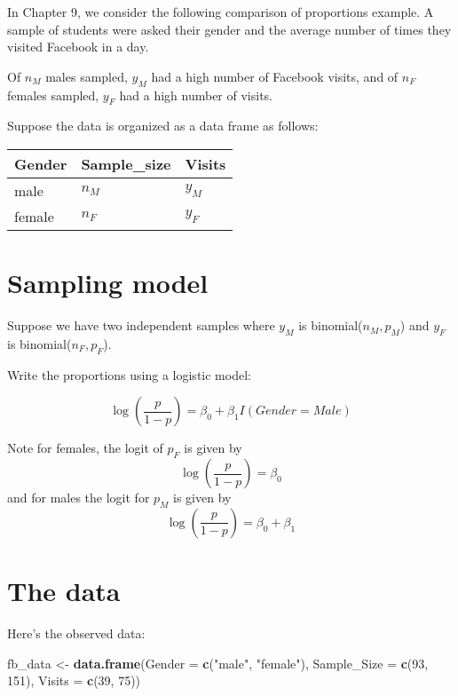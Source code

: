 \documentclass[
]{book}
\newenvironment{Shaded}{\begin{snugshade}}{\end{snugshade}}
\newcommand{\DataTypeTok}[1]{\textcolor[rgb]{0.13,0.29,0.53}{#1}}
\newcommand{\DecValTok}[1]{\textcolor[rgb]{0.00,0.00,0.81}{#1}}
\newcommand{\KeywordTok}[1]{\textcolor[rgb]{0.13,0.29,0.53}{\textbf{#1}}}
\newcommand{\NormalTok}[1]{#1}
\newcommand{\StringTok}[1]{\textcolor[rgb]{0.31,0.60,0.02}{#1}}
\begin{document}
In Chapter 9, we consider the following comparison of proportions example. A sample of students were asked their gender and the average number of times they visited Facebook in a day.

Of \(n_M\) males sampled, \(y_M\) had a high number of Facebook visits, and of \(n_F\) females sampled, \(y_F\) had a high number of visits.

Suppose the data is organized as a data frame as follows:

\begin{longtable}[]{@{}lll@{}}
\toprule
Gender & Sample\_size & Visits\tabularnewline
\midrule
\endhead
male & \(n_M\) & \(y_M\)\tabularnewline
female & \(n_F\) & \(y_F\)\tabularnewline
\bottomrule
\end{longtable}

\hypertarget{sampling-model}{%
\section{Sampling model}\label{sampling-model}}

Suppose we have two independent samples where \(y_M\) is binomial(\(n_M, p_M\)) and \(y_F\) is binomial(\(n_F, p_F\)).

Write the proportions using a logistic model:

\[
\log\left(\frac{p}{1-p}\right) = \beta_0 + \beta_1 I(Gender = Male)
\]

Note for females, the logit of \(p_F\) is given by
\[
\log\left(\frac{p}{1-p}\right) = \beta_0
\]
and for males the logit for \(p_M\) is given by
\[
\log\left(\frac{p}{1-p}\right) = \beta_0 + \beta_1
\]

\hypertarget{the-data}{%
\section{The data}\label{the-data}}

Here's the observed data:

\begin{Shaded}
\begin{Highlighting}[]
\NormalTok{fb_data <-}\StringTok{ }\KeywordTok{data.frame}\NormalTok{(}\DataTypeTok{Gender =} \KeywordTok{c}\NormalTok{(}\StringTok{"male"}\NormalTok{, }\StringTok{"female"}\NormalTok{),}
                      \DataTypeTok{Sample_Size =} \KeywordTok{c}\NormalTok{(}\DecValTok{93}\NormalTok{, }\DecValTok{151}\NormalTok{),}
                      \DataTypeTok{Visits =} \KeywordTok{c}\NormalTok{(}\DecValTok{39}\NormalTok{, }\DecValTok{75}\NormalTok{))}
\end{Highlighting}
\end{Shaded}
\end{document}
